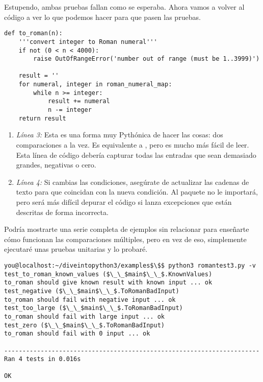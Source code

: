 Estupendo, ambas pruebas fallan como se esperaba. Ahora vamos a volver al código a ver lo que podemos hacer para que pasen las pruebas.

\noindent\begin{minipage}{\textwidth}
\begin{lstlisting}[mathescape=True]
def to_roman(n):
    '''convert integer to Roman numeral'''
    if not (0 < n < 4000):
        raise OutOfRangeError('number out of range (must be 1..3999)')

    result = ''
    for numeral, integer in roman_numeral_map:
        while n >= integer:
            result += numeral
            n -= integer
    return result
\end{lstlisting}
\end{minipage}

\begin{enumerate}

\item \emph{Línea 3:} Esta es una forma muy Pythónica de hacer las cosas: dos comparaciones a la vez. Es equivalente a , pero es mucho más fácil de leer. Esta línea de código debería capturar todas las entradas que sean demasiado grandes, negativas o cero.

\item \emph{Línea 4:} Si cambias las condiciones, asegúrate de actualizar las cadenas de texto para que coincidan con la nueva condición. Al paquete  no le importará, pero será más difícil depurar el código si lanza excepciones que están descritas de forma incorrecta.

\end{enumerate}

Podría mostrarte una serie completa de ejemplos sin relacionar para enseñarte cómo funcionan las comparaciones múltiples, pero en vez de eso, simplemente ejecutaré unas pruebas unitarias y lo probaré.

\noindent\begin{minipage}{\textwidth}
\begin{lstlisting}[mathescape=True]
you@localhost:~/diveintopython3/examples$\$$ python3 romantest3.py -v
test_to_roman_known_values ($\_\_$main$\_\_$.KnownValues)
to_roman should give known result with known input ... ok
test_negative ($\_\_$main$\_\_$.ToRomanBadInput)
to_roman should fail with negative input ... ok
test_too_large ($\_\_$main$\_\_$.ToRomanBadInput)
to_roman should fail with large input ... ok
test_zero ($\_\_$main$\_\_$.ToRomanBadInput)
to_roman should fail with 0 input ... ok

----------------------------------------------------------------------
Ran 4 tests in 0.016s

OK
\end{lstlisting}
\end{minipage}

